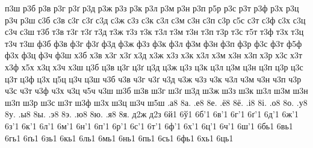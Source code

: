 {п3ш
р3б
р3в
р3г
р3ґ
р3д
р3ж
р3з
р3к
р3л
р3м
р3н
р3п
р5р
р3с
р3т
р3ф
р3х
р3ц
р3ч
р3ш
с3б
с3в
с3г
с3ґ
с3д
с3ж
с3з
с3к
с3л
с3м
с3н
с3п
с3р
с5с
с3т
с3ф
с3х
с3ц
с3ч
с3ш
т3б
т3в
т3г
т3ґ
т3д
т3ж
т3з
т3к
т3л
т3м
т3н
т3п
т3р
т3с
т5т
т3ф
т3х
т3ц
т3ч
т3ш
ф3б
ф3в
ф3г
ф3ґ
ф3д
ф3ж
ф3з
ф3к
ф3л
ф3м
ф3н
ф3п
ф3р
ф3с
ф3т
ф5ф
ф3х
ф3ц
ф3ч
ф3ш
х3б
х3в
х3г
х3ґ
х3д
х3ж
х3з
х3к
х3л
х3м
х3н
х3п
х3р
х3с
х3т
х3ф
х5х
х3ц
х3ч
х3ш
ц3б
ц3в
ц3г
ц3ґ
ц3д
ц3ж
ц3з
ц3к
ц3л
ц3м
ц3н
ц3п
ц3р
ц3с
ц3т
ц3ф
ц3х
ц5ц
ц3ч
ц3ш
ч3б
ч3в
ч3г
ч3ґ
ч3д
ч3ж
ч3з
ч3к
ч3л
ч3м
ч3н
ч3п
ч3р
ч3с
ч3т
ч3ф
ч3х
ч3ц
ч5ч
ч3ш
ш3б
ш3в
ш3г
ш3ґ
ш3д
ш3ж
ш3з
ш3к
ш3л
ш3м
ш3н
ш3п
ш3р
ш3с
ш3т
ш3ф
ш3х
ш3ц
ш3ч
ш5ш
%
%
%
.а8
8а.
.е8
8е.
.ё8
8ё.
.і8
8і.
.о8
8о.
.у8
8у.
.ы8
8ы.
.э8
8э.
.ю8
8ю.
.я8
8я.
%
%
%
%
%
д2ж
д2з
%
%
%
6й1
6ў1
%
%
%
6б'1
6в'1
6г'1
6ґ'1
6д'1
6ж'1
6з'1
6к'1
6л'1
6м'1
6н'1
6п'1
6р'1
6с'1
6т'1
6ф'1
6х'1
6ц'1
6ч'1
6ш'1
6бь1
6вь1
6гь1
6ґь1
6зь1
6кь1
6ль1
6мь1
6нь1
6пь1
6сь1
6фь1
6хь1
6ць1
%
}
